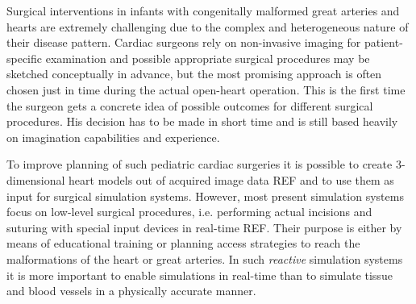 Surgical interventions in infants with congenitally malformed great arteries and hearts are extremely challenging due to the complex and heterogeneous nature of their disease pattern. Cardiac surgeons rely on non-invasive imaging for patient-specific examination and possible appropriate surgical procedures may be sketched conceptually in advance, but the most promising approach is often chosen just in time during the actual open-heart operation. This is the first time the surgeon gets a concrete idea of possible outcomes for different surgical procedures. His decision has to be made in short time and is still based heavily on imagination capabilities and experience.

To improve planning of such pediatric cardiac surgeries it is possible to create 3-dimensional heart models out of acquired image data REF and to use them as input for surgical simulation systems. However, most present simulation systems focus on low-level surgical procedures, i.e. performing actual incisions and suturing with special input devices in real-time REF. Their purpose is either by means of educational training or planning access strategies to reach the malformations of the heart or great arteries. In such {\itshape reactive}   simulation systems it is more important to enable simulations in real-time than to simulate tissue and blood vessels in a physically accurate manner.
 

